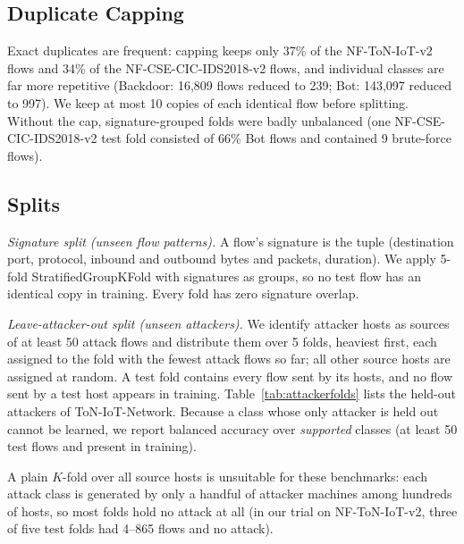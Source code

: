 \documentclass[journal]{IEEEtran}
\begin{document}
\subsection{Duplicate Capping}
Exact duplicates are frequent: capping keeps only 37\% of the NF-ToN-IoT-v2 flows and 34\% of the NF-CSE-CIC-IDS2018-v2 flows, and individual classes are far more repetitive (Backdoor: 16{,}809 flows reduced to 239; Bot: 143{,}097 reduced to 997). We keep at most 10 copies of each identical flow before splitting. Without the cap, signature-grouped folds were badly unbalanced (one NF-CSE-CIC-IDS2018-v2 test fold consisted of 66\% Bot flows and contained 9 brute-force flows).

\subsection{Splits}
\emph{Signature split (unseen flow patterns).} A flow's signature is the tuple (destination port, protocol, inbound and outbound bytes and packets, duration). We apply 5-fold StratifiedGroupKFold with signatures as groups, so no test flow has an identical copy in training. Every fold has zero signature overlap.

\emph{Leave-attacker-out split (unseen attackers).} We identify attacker hosts as sources of at least 50 attack flows and distribute them over 5 folds, heaviest first, each assigned to the fold with the fewest attack flows so far; all other source hosts are assigned at random. A test fold contains every flow sent by its hosts, and no flow sent by a test host appears in training. Table~\ref{tab:attackerfolds} lists the held-out attackers of ToN-IoT-Network. Because a class whose only attacker is held out cannot be learned, we report balanced accuracy over \emph{supported} classes (at least 50 test flows and present in training).

A plain $K$-fold over all source hosts is unsuitable for these benchmarks: each attack class is generated by only a handful of attacker machines among hundreds of hosts, so most folds hold no attack at all (in our trial on NF-ToN-IoT-v2, three of five test folds had 4--865 flows and no attack).
\end{document}
